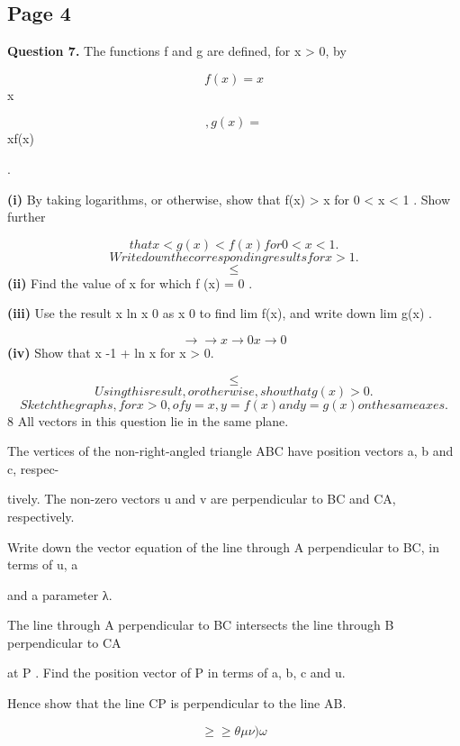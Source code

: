 \documentclass[12pt]{article}
\begin{document}
\subsection*{Page 4}
\begin{flushleft}
\bigskip\textbf{Question 7.} The functions f and g are defined, for x > 0, by\par
\[f(x) = x\]
x\par
\[, g(x) =\]
xf(x)\par
.\par
\textbf{(i)} By taking logarithms, or otherwise, show that f(x) > x for 0 < x < 1 . Show further\par
\[that x < g(x) < f(x) for 0 < x < 1 .\]
\[Write down the corresponding results for x > 1 .\]
\[\leq\]
\textbf{(ii)} Find the value of x for which f (x) = 0 .\par
\textbf{(iii)} Use the result x ln x 0 as x 0 to find lim f(x), and write down lim g(x) .\par
\[\to \to x\to0 x\to0\]
\textbf{(iv)} Show that x -1 + ln x  for x > 0.\par
\[\leq\]
\[Using this result, or otherwise, show that g (x) > 0 .\]
\[Sketch the graphs, for x > 0, of y = x, y = f(x) and y = g(x) on the same axes.\]
8 All vectors in this question lie in the same plane.\par
The vertices of the non-right-angled triangle ABC have position vectors a, b and c, respec-\par
tively. The non-zero vectors u and v are perpendicular to BC and CA, respectively.\par
Write down the vector equation of the line through A perpendicular to BC, in terms of u, a\par
and a parameter λ.\par
The line through A perpendicular to BC intersects the line through B perpendicular to CA\par
at P . Find the position vector of P in terms of a, b, c and u.\par
Hence show that the line CP is perpendicular to the line AB.\par
\[\geq\geq\theta\mu\nu) \omega\]
\end{flushleft}
\end{document}
